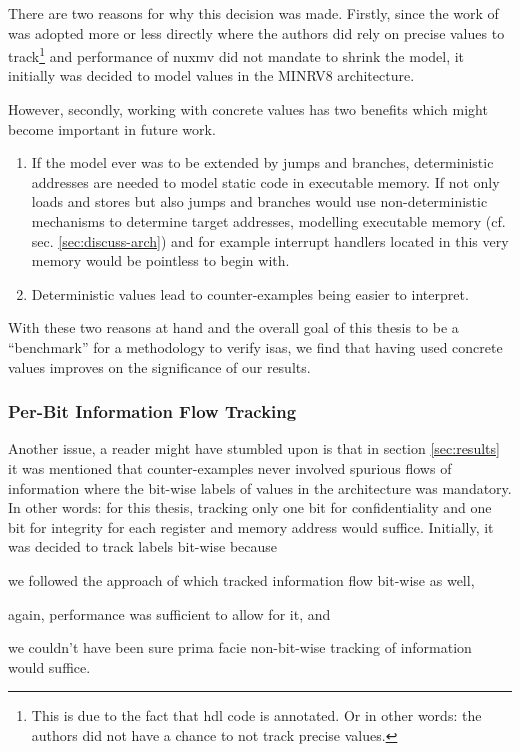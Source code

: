 There are two reasons for why this decision was made.
Firstly, since the work of \citeauthor{Ferraiuolo17} \cite{Ferraiuolo17} was adopted more or less directly where the authors did rely on precise values to track\footnote{%
    This is due to the fact that \gls{hdl} code is annotated.
    Or in other words: the authors did not have a chance to not track precise values.
} and performance of \gls{nuxmv} did not mandate to shrink the model, it initially was decided to model values in the MINRV8 architecture.

However, secondly, working with concrete values has two benefits which might become important in future work.
\begin{enumerate}
    \item If the model ever was to be extended by jumps and branches, deterministic addresses are needed to model static code in executable memory.
    If not only loads and stores but also jumps and branches would use non-deterministic mechanisms to determine target addresses, modelling executable memory (cf. sec. \ref{sec:discuss-arch}) and for example interrupt handlers located in this very memory would be pointless to begin with.
    \item Deterministic values lead to counter-examples being easier to interpret.
\end{enumerate}

With these two reasons at hand and the overall goal of this thesis to be a \enquote{benchmark} for a methodology to verify \glspl{isa}, we find that having used concrete values improves on the significance of our results.

\subsubsection{Per-Bit Information Flow Tracking}

Another issue, a reader might have stumbled upon is that in section \ref{sec:results} it was mentioned that counter-examples never involved spurious flows of information where the bit-wise labels of values in the architecture was mandatory.
In other words: for this thesis, tracking only one bit for confidentiality and one bit for integrity for each register and memory address would suffice.
Initially, it was decided to track labels bit-wise because \begin{enumerate*}[label=\alph*)]
    \item we followed the approach of \citeauthor{Ferraiuolo17} \cite{Ferraiuolo17} which tracked information flow bit-wise as well,
    \item again, performance was sufficient to allow for it, and
    \item we couldn't have been sure prima facie non-bit-wise tracking of information would suffice.
\end{enumerate*}

